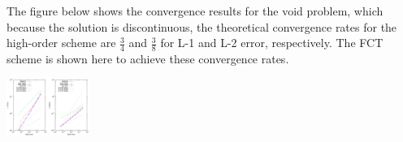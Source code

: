 The figure below shows the convergence results for the void
problem, which because the solution is discontinuous, the theoretical
convergence rates for the high-order scheme are $\frac{3}{4}$ and $\frac{3}{8}$
for L-1 and L-2 error, respectively. The FCT scheme is shown here to
achieve these convergence rates.

\includegraphics[width=0.20\textwidth]{figures/convergence_3_SSPRK33.pdf}
